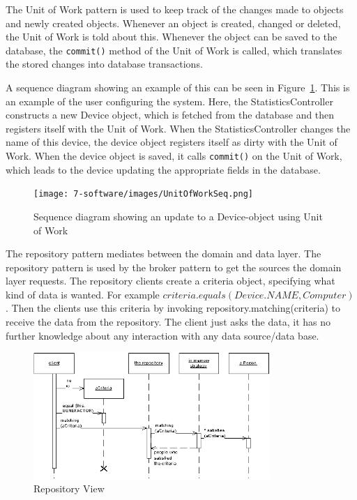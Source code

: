 The Unit of Work pattern is used to keep track of the changes made to objects and newly created objects. Whenever an object is created, changed or deleted, the Unit of Work is told about this. 
Whenever the object can be saved to the database, the \verb|commit()| method of the Unit of Work is called, which translates the stored changes into database transactions.

A sequence diagram showing an example of this can be seen in Figure~\ref{fig:unitofworkseq}. 
This is an example of the user configuring the system. Here, the StatisticsController constructs a new Device object, which is fetched from the database and then registers itself with the Unit of Work. When the StatisticsController changes the name of this device, the device object registers itself as dirty with the Unit of Work. 
When the device object is saved, it calls \verb|commit()| on the Unit of Work, which leads to the device updating the appropriate fields in the database.

\begin{figure}[H]
\centering
\texttt{[image: 7-software/images/UnitOfWorkSeq.png]}
\caption{Sequence diagram showing an update to a Device-object using Unit of Work}
\label{fig:unitofworkseq}
\end{figure}

The repository pattern mediates between the domain and data layer. 
The repository pattern is used by the broker pattern to get the sources the domain layer requests. The repository clients create a criteria object, specifying what kind of data is wanted. For example $criteria.equals(Device.NAME, Computer)$. Then the clients use this criteria by invoking repository.matching(criteria) to receive the data from the repository. The client just asks the data, it has no further knowledge about any interaction with any data source/data base.

\begin{figure}[H]
	\centering
	\includegraphics[width=0.8\textwidth]{7-software/images/repositorySketch.png}
	\caption{Repository View}
	\label{fig:template-view-architecture}
\end{figure}

